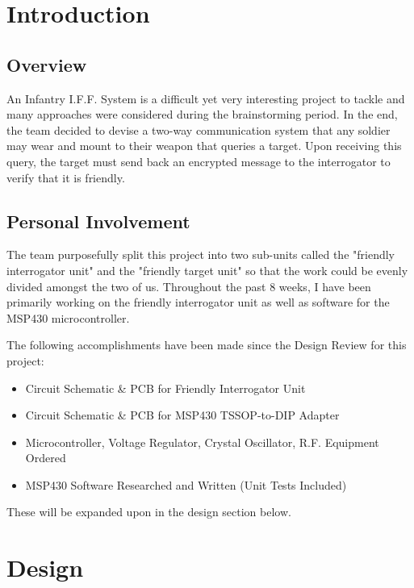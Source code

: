 \documentclass[letterpaper,10pt]{article}
\newcommand{\buildtoc}{
	\clearpage
	\singlespacing
	\tableofcontents
	\onehalfspacing
}
\begin{document}
\begin{spacing}{1.15}


\color{black}
\buildtoc
{}
\clearpage
\setcounter{page}{1}

\section{Introduction}
\subsection{Overview}
An Infantry I.F.F. System is a difficult yet very interesting project to tackle and many approaches were considered during the brainstorming period. In the end, the team decided to devise a two-way communication system that any soldier may wear and mount to their weapon that queries a target. Upon receiving this query, the target must send back an encrypted message to the interrogator to verify that it is friendly. 

\subsection{Personal Involvement}
The team purposefully split this project into two sub-units called the "friendly interrogator unit" and the "friendly target unit" so that the work could be evenly divided amongst the two of us. Throughout the past 8 weeks, I have been primarily working on the friendly interrogator unit as well as software for the MSP430 microcontroller.


The following accomplishments have been made since the Design Review for this project:

\begin{itemize}
	\item Circuit Schematic \& PCB for Friendly Interrogator Unit
	\item Circuit Schematic \& PCB for MSP430 TSSOP-to-DIP Adapter
	\item Microcontroller, Voltage Regulator, Crystal Oscillator, R.F. Equipment Ordered
	\item MSP430 Software Researched and Written (Unit Tests Included)
\end{itemize}

These will be expanded upon in the design section below. 

\section{Design}


\end{spacing}
\end{document}

